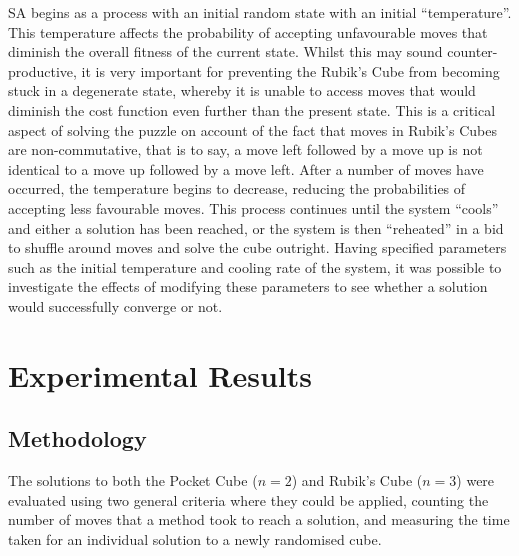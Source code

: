 \documentclass[UKenglish]{libraries/svproc}
\begin{document}
SA begins as a process with an initial random state with an initial ``temperature''. This temperature affects the probability of accepting unfavourable moves that diminish the overall fitness of the current state. Whilst this may sound counter-productive, it is very important for preventing the Rubik's Cube from becoming stuck in a degenerate state, whereby it is unable to access moves that would diminish the cost function even further than the present state. This is a critical aspect of solving the puzzle on account of the fact that moves in Rubik's Cubes are non-commutative, that is to say, a move left followed by a move up is not identical to a move up followed by a move left. After a number of moves have occurred, the temperature begins to decrease, reducing the probabilities of accepting less favourable moves. This process continues until the system ``cools'' and either a solution has been reached, or the system is then ``reheated'' in a bid to shuffle around moves and solve the cube outright. Having specified parameters such as the initial temperature and cooling rate of the system, it was possible to investigate the effects of modifying these parameters to see whether a solution would successfully converge or not.



\section{Experimental Results}

\subsection{Methodology}
The solutions to both the Pocket Cube ($n=2$) and Rubik's Cube ($n=3$) were evaluated using two general criteria where they could be applied, counting the number of moves that a method took to reach a solution, and measuring the time taken for an individual solution to a newly randomised cube.
\end{document}
